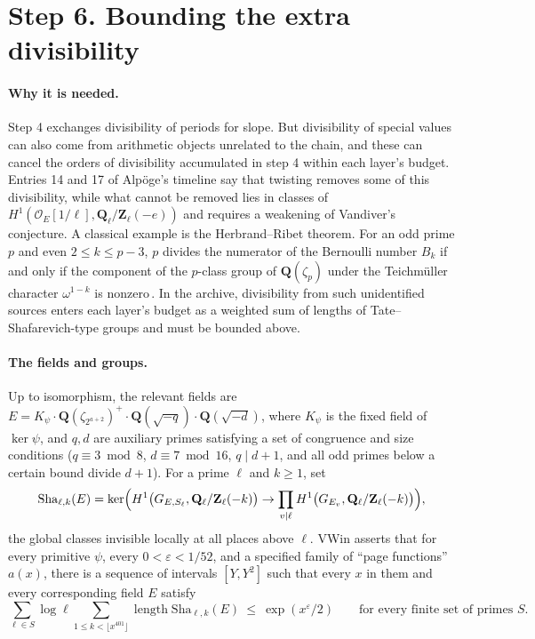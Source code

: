 \documentclass[11pt]{article}
\newcommand{\Q}{\mathbf{Q}}
\newcommand{\Z}{\mathbf{Z}}
\newcommand{\Sha}{\mathrm{Sha}}
\begin{document}
\section{Step 6. Bounding the extra divisibility}\label{sec:s6}

\paragraph{Why it is needed.} Step 4 exchanges divisibility of periods for slope. But divisibility of special values can also come from arithmetic objects unrelated to the chain, and these can cancel the orders of divisibility accumulated in step 4 within each layer's budget. Entries 14 and 17 of Alpöge's timeline say that twisting removes some of this divisibility, while what cannot be removed lies in classes of $H^1(\mathcal O_E[1/\ell],\Q_\ell/\Z_\ell(-e))$ and requires a weakening of Vandiver's conjecture. A classical example is the Herbrand--Ribet theorem. For an odd prime $p$ and even $2\le k\le p-3$, $p$ divides the numerator of the Bernoulli number $B_k$ if and only if the component of the $p$-class group of $\Q(\zeta_p)$ under the Teichmüller character $\omega^{1-k}$ is nonzero\,\cite{herbrand,ribet}. In the archive, divisibility from such unidentified sources enters each layer's budget as a weighted sum of lengths of Tate--Shafarevich-type groups and must be bounded above.

\paragraph{The fields and groups.} Up to isomorphism, the relevant fields are $E=K_\psi\cdot\Q(\zeta_{2^{a+2}})^+\cdot\Q(\sqrt{-q})\cdot\Q(\sqrt{-d})$, where $K_\psi$ is the fixed field of $\ker\psi$, and $q,d$ are auxiliary primes satisfying a set of congruence and size conditions ($q\equiv3\bmod8$, $d\equiv7\bmod16$, $q\mid d+1$, and all odd primes below a certain bound divide $d+1$). For a prime $\ell$ and $k\ge1$, set
\[
\Sha_{\ell,k}(E)=\ker\Bigl(H^1\bigl(G_{E,S_\ell},\Q_\ell/\Z_\ell(-k)\bigr)\to\prod_{v\mid\ell}H^1\bigl(G_{E_v},\Q_\ell/\Z_\ell(-k)\bigr)\Bigr),
\]
the global classes invisible locally at all places above $\ell$. \textsf{VWin} asserts that for every primitive $\psi$, every $0<\varepsilon<1/52$, and a specified family of ``page functions'' $a(x)$, there is a sequence of intervals $[Y,Y^2]$ such that every $x$ in them and every corresponding field $E$ satisfy
\[
\sum_{\ell\in S}\log\ell\sum_{1\le k<\lfloor x^{401}\rfloor}\operatorname{length}\Sha_{\ell,k}(E)\ \le\ \exp(x^{\varepsilon}/2)\qquad\text{for every finite set of primes } S .
\]
\end{document}

